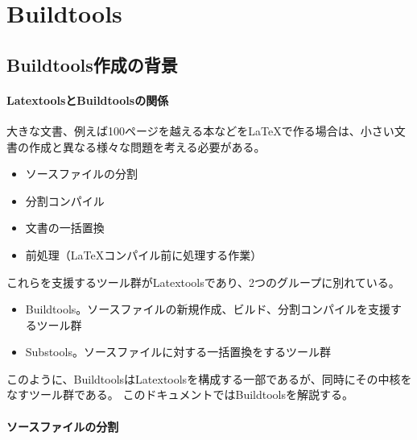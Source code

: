 \hypertarget{buildtools}{%
\section{Buildtools}\label{buildtools}}

\hypertarget{buildtoolsux4f5cux6210ux306eux80ccux666f}{%
\subsection{Buildtools作成の背景}\label{buildtoolsux4f5cux6210ux306eux80ccux666f}}

\hypertarget{latextoolsux3068buildtoolsux306eux95a2ux4fc2}{%
\paragraph{LatextoolsとBuildtoolsの関係}\label{latextoolsux3068buildtoolsux306eux95a2ux4fc2}}

大きな文書、例えば100ページを越える本などをLaTeXで作る場合は、小さい文書の作成と異なる様々な問題を考える必要がある。

\begin{itemize}
\tightlist
\item
  ソースファイルの分割
\item
  分割コンパイル
\item
  文書の一括置換
\item
  前処理（LaTeXコンパイル前に処理する作業）
\end{itemize}

これらを支援するツール群がLatextoolsであり、2つのグループに別れている。

\begin{itemize}
\tightlist
\item
  Buildtools。ソースファイルの新規作成、ビルド、分割コンパイルを支援するツール群
\item
  Substools。ソースファイルに対する一括置換をするツール群
\end{itemize}

このように、BuildtoolsはLatextoolsを構成する一部であるが、同時にその中核をなすツール群である。
このドキュメントではBuildtoolsを解説する。

\hypertarget{ux30bdux30fcux30b9ux30d5ux30a1ux30a4ux30ebux306eux5206ux5272}{%
\paragraph{ソースファイルの分割}\label{ux30bdux30fcux30b9ux30d5ux30a1ux30a4ux30ebux306eux5206ux5272}}

